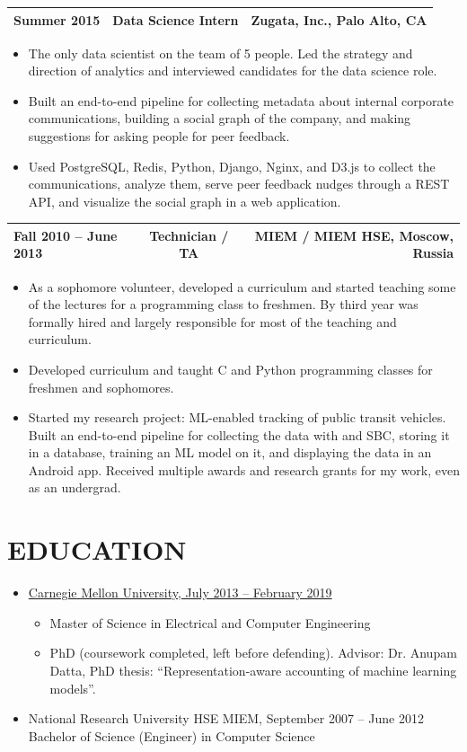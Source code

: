 \documentclass{res}
\makeatletter
\newcommand{\ExperienceHeader}[3]{%
  \Needspace{9\baselineskip}%
  \par\vspace{0.35ex}%
  \noindent
  \begin{tabular*}{\textwidth}{@{}l@{\extracolsep{\fill}}c@{\extracolsep{\fill}}r@{}}
    #1 & \textbf{#2} & #3 \\[-0.2ex]
    \hline
  \end{tabular*}%
  \par\nopagebreak[4]\vspace{0.35ex}\nopagebreak[4]%
}
\makeatother
\begin{document}
\begin{resume}
\ExperienceHeader{Summer 2015}{Data Science Intern}{Zugata, Inc., Palo Alto, CA}
\begin{itemize}
	\item
		The only data scientist on the team of 5 people. Led the strategy and direction of analytics and interviewed candidates for the data science role.
	\item
		Built an end-to-end pipeline for collecting metadata about internal corporate communications, building a social graph of the company, and making suggestions for asking people for peer feedback.
	\item
		Used PostgreSQL, Redis, Python, Django, Nginx, and D3.js to collect the communications, analyze them, serve peer feedback nudges through a REST API, and visualize the social graph in a web application.
\end{itemize}


\ExperienceHeader{Fall 2010 -- June 2013}{Technician / TA}{MIEM / MIEM HSE, Moscow, Russia}
\begin{itemize}
	\item
		As a sophomore volunteer, developed a curriculum and started teaching some of the lectures for a programming class to freshmen. By third year was formally hired and largely responsible for most of the teaching and curriculum.
	\item
		Developed curriculum and taught C and Python programming classes for freshmen and sophomores.
	\item
		Started my research project: ML-enabled tracking of public transit vehicles. Built an end-to-end pipeline for collecting the data with and SBC, storing it in a database, training an ML model on it, and displaying the data in an Android app. Received multiple awards and research grants for my work, even as an undergrad.
\end{itemize}
 
\section{EDUCATION}
\begin{itemize}
	\item
		\underline{Carnegie Mellon University, July 2013 -- February 2019}
		\begin{itemize}
			\item
				Master of Science in Electrical and Computer Engineering
			\item
				PhD (coursework completed, left before defending). Advisor: Dr. Anupam Datta, PhD thesis: ``Representation-aware accounting of machine learning models''.
		\end{itemize}
	\item
		National Research University HSE MIEM, September 2007 -- June 2012\\
		Bachelor of Science (Engineer) in Computer Science
\end{itemize}


\end{resume}
\end{document}
